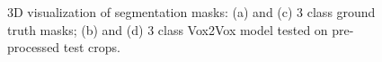 \begin{figure}[!htb]
\centering
{}\hfil
{}

\hfil 
{}

\caption{\ac{3D} visualization of segmentation masks: (a) and (c) 3 class ground truth masks; (b) and (d) 3 class Vox2Vox model tested on pre-processed test crops.}

\label{fig:results-vox2vox-3channel}

\end{figure}

